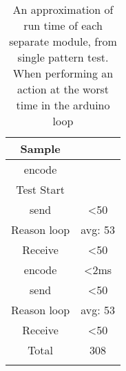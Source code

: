 \begin{center}
	\begin{table}[htbp]
	  \centering
	  \begin{tabular}{c | c}
		\toprule
		Sample  		& 			\\ \midrule
		encode 			& 		  	\\
		Test Start		&			\\
		send   			& <50  		\\
		Reason loop 	& avg: 53 	\\
		Receive 		& <50  		\\
		encode 			& <2ms  	\\
		send   			& <50  		\\
		Reason loop 	& avg: 53 	\\
		Receive 		& <50  		\\
		Total			& 308		\\
									\\ \bottomrule
	  \end{tabular}
	  \caption{An approximation of run time of each separate module, from single pattern test. When performing an action at the worst time in the arduino loop}
	\end{table}
 \label{Table:WorstRunTimeAprox}
\end{center}








